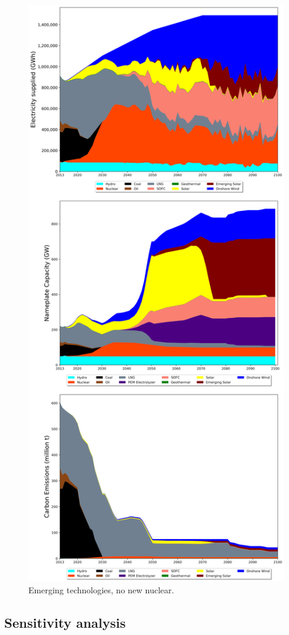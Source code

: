 \begin{figure}[h] 
\centering
\vspace*{-3cm}
\includegraphics[scale=0.41]{figures/newtechs_nuc}
\caption{Emerging technologies, no new nuclear.}
\label{scen4}
\end{figure}

\subsection{Sensitivity analysis}